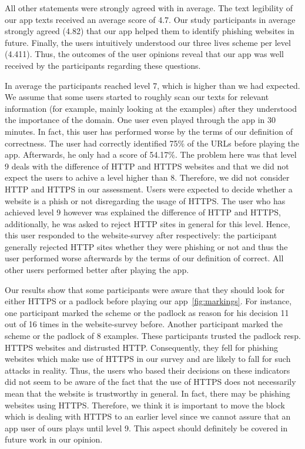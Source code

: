 \begin{description}[leftmargin=0cm]
	All other statements were strongly agreed with in average.
	The text legibility of our app texts received an average score of 4.7.
	Our study participants in average strongly agreed (4.82) that our app helped them to identify phishing websites in future.
	Finally, the users intuitively understood our three lives scheme per level (4.411).
	Thus, the outcomes of the user opinions reveal that our app was well received by the participants regarding these questions.
	\item[Achieved Levels:] In average the participants reached level 7, which is higher than we had expected.
	We assume that some users started to roughly scan our texts for relevant information (for example, mainly looking at the examples) after they understood the importance of the domain.
	One user even played through the app in 30 minutes.
	In fact, this user has performed worse by the terms of our definition of correctness.
	The user had correctly identified 75\% of the URLs before playing the app.
	Afterwards, he only had a score of 54.17\%.
	The problem here was that level 9 deals with the difference of HTTP and HTTPS websites and that we did not expect the users to achive a level higher than 8.
	Therefore, we did not consider HTTP and HTTPS in our assessment.
	Users were expected to decide whether a website is a phish or not disregarding the usage of HTTPS.
	The user who has achieved level 9 however was explained the difference of HTTP and HTTPS, additionally, he was asked to reject HTTP sites in general for this level.
	Hence, this user responded to the website-survey after respectively: the participant generally rejected HTTP sites whether they were phishing or not and thus the user performed worse afterwards by the terms of our definition of correct.
	All other users performed better after playing the app.
	\item[HTTPS and Padlock:] Our results show that some participants were aware that they should look for either HTTPS or a padlock before playing our app~\autoref{fig:markings}.
	For instance, one participant marked the scheme or the padlock as reason for his decision 11 out of 16 times in the website-survey before. 
	Another participant marked the scheme or the padlock of 8 examples.
	These participants trusted the padlock resp. HTTPS websites and distrusted HTTP.
	Consequently, they fell for phishing websites which make use of HTTPS in our survey and are likely to fall for such attacks in reality.
	Thus, the users who based their decisions on these indicators did not seem to be aware of the fact that the use of HTTPS does not necessarily mean that the website is trustworthy in general.
	In fact, there may be phishing websites using HTTPS.
	Therefore, we think it is important to move the block which is dealing with HTTPS to an earlier level since we cannot assure that an app user of ours plays until level 9.
	This aspect should definitely be covered in future work in our opinion.
	
\end{description}

